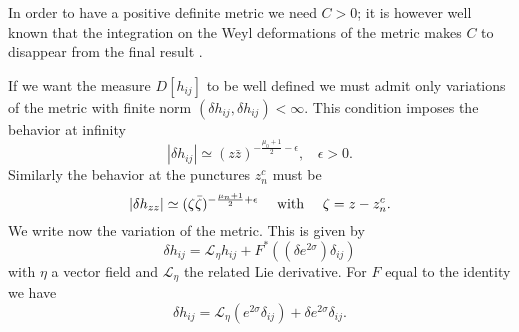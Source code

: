 \documentclass[a4paper,12pt]{article}
\begin{document}
In order to have a positive definite metric we need $C>0$; it is
however well known that the integration on the Weyl deformations of the
metric makes $C$ to disappear from the final result
\cite{polyakov,menottipeirano}.

If we want the measure $D[h_{ij}]$ to be well defined we must admit
only variations of the metric with finite norm
$(\delta h_{ij}, \delta h_{ij}) < \infty$.
This condition imposes the behavior at infinity
\begin{equation}\label{condinfty}
|\delta h_{ij}| \simeq (z\bar z)^{-\frac{\mu_0+1}{2}-\epsilon},~~~~
\epsilon >0.
\end{equation}
Similarly the behavior at the punctures $z^c_n$ must be
\begin{equation}\label{condpunct}
|\delta h_{zz}| \simeq (\zeta
 \bar\zeta)^{-\frac{\mu_n+1}{2}+\epsilon}~~~~{\rm with}~~~~\zeta=
 z-z^c_n. 
\end{equation}
We write now the variation of the metric. This is given by
\begin{equation}\label{decompdeltah}
\delta h_{ij} = \mathcal{L}_{\eta} h_{ij} + F^*((\delta
e^{2\sigma})\delta_{ij})
\end{equation}
with $\eta$ a vector field and $ \mathcal{L}_{\eta}$ the related Lie
derivative. For $F$ equal to the identity we have
\begin{equation}
\delta h_{ij} = \mathcal{L}_{\eta} (e^{2\sigma}\delta_{ij}) + \delta 
e^{2\sigma}\delta_{ij}.
\end{equation}
\end{document}
